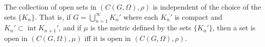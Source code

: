 The collection of open sets in $(C(G, \Omega), \rho)$ is independent of the choice of the sets $\{K_n\}$. That is, if $G = \bigcup_{n=1}^{\infty} K_n'$ where each $K_n'$ is compact and $K_n' \subset \operatorname{int} K_{n+1}'$, and if $\mu$ is the metric defined by the sets $\{K_n'\}$, then a set is open in $(C(G, \Omega), \mu)$ iff it is open in $(C(G, \Omega), \rho)$.
